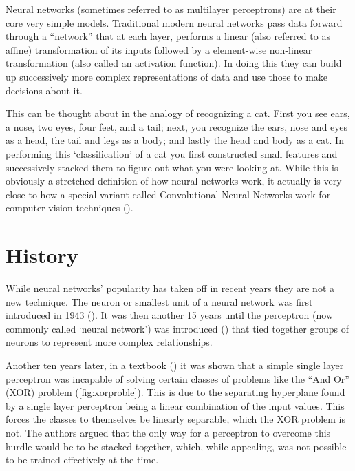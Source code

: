 \documentclass[]{book}
\theoremstyle{definition}
\theoremstyle{definition}
\theoremstyle{definition}
\theoremstyle{remark}
\begin{document}
Neural networks (sometimes referred to as multilayer perceptrons) are at
their core very simple models. Traditional modern neural networks pass
data forward through a ``network'' that at each layer, performs a linear
(also referred to as affine) transformation of its inputs followed by a
element-wise non-linear transformation (also called an activation
function). In doing this they can build up successively more complex
representations of data and use those to make decisions about it.

This can be thought about in the analogy of recognizing a cat. First you
see ears, a nose, two eyes, four feet, and a tail; next, you recognize
the ears, nose and eyes as a head, the tail and legs as a body; and
lastly the head and body as a cat. In performing this `classification'
of a cat you first constructed small features and successively stacked
them to figure out what you were looking at. While this is obviously a
stretched definition of how neural networks work, it actually is very
close to how a special variant called Convolutional Neural Networks work
for computer vision techniques (\citet{cnn_vis}).

\section{History}\label{history}

While neural networks' popularity has taken off in recent years they are
not a new technique. The neuron or smallest unit of a neural network was
first introduced in 1943 (\citet{mcculloch_neuron}). It was then another
15 years until the perceptron (now commonly called `neural network') was
introduced (\citet{rosenblatt_perceptron}) that tied together groups of
neurons to represent more complex relationships.

Another ten years later, in a textbook (\citet{minsky_perceptrons}) it
was shown that a simple single layer perceptron was incapable of solving
certain classes of problems like the ``And Or'' (XOR) problem
(\ref{fig:xorproble}). This is due to the separating hyperplane found by
a single layer perceptron being a linear combination of the input
values. This forces the classes to themselves be linearly separable,
which the XOR problem is not. The authors argued that the only way for a
perceptron to overcome this hurdle would be to be stacked together,
which, while appealing, was not possible to be trained effectively at
the time.
\end{document}
